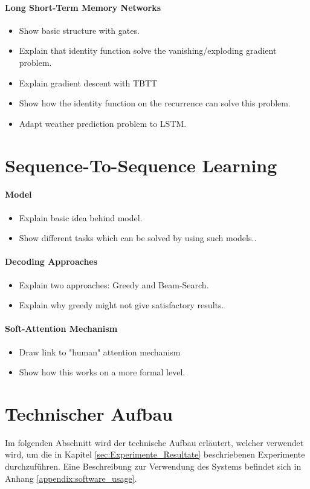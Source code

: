 \paragraph{Long Short-Term Memory Networks}
\begin{itemize}
	\item Show basic structure with gates.
	\item Explain that identity function solve the vanishing/exploding gradient problem.
	\item Explain gradient descent with TBTT
	\item Show how the identity function on the recurrence can solve this problem.
	\item Adapt weather prediction problem to LSTM.
\end{itemize}

\section{Sequence-To-Sequence Learning}
\paragraph{Model}
\begin{itemize}
	\item Explain basic idea behind model.
	\item Show different tasks which can be solved by using such models..
\end{itemize}

\paragraph{Decoding Approaches}
\begin{itemize}
	\item Explain two approaches: Greedy and Beam-Search.
	\item Explain why greedy might not give satisfactory results.
\end{itemize}
\paragraph{Soft-Attention Mechanism}
\begin{itemize}
	\item Draw link to "human" attention mechanism
	\item Show how this works on a more formal level.
\end{itemize}

\section{Technischer Aufbau}
\label{technical_setup}
Im folgenden Abschnitt wird der technische Aufbau erläutert, welcher verwendet wird, um die in Kapitel \ref{sec:Experimente_Resultate} beschriebenen Experimente durchzuführen. Eine Beschreibung zur Verwendung des Systems befindet sich in Anhang \ref{appendix:software_usage}.

